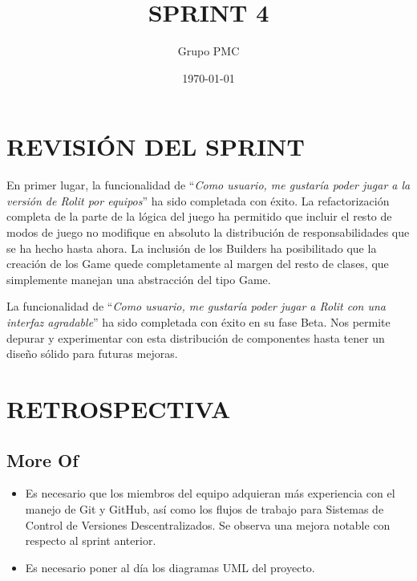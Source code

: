 \documentclass{article}
\title{SPRINT 4}
\date{\today}
\author{Grupo PMC}
\begin{document}
\maketitle
\section{REVISIÓN DEL SPRINT}
En primer lugar, la funcionalidad de ``\textit{Como usuario, me gustaría poder jugar a la versión de Rolit por equipos}'' ha sido completada con éxito. La refactorización completa de la parte de la lógica del juego ha permitido que incluir el resto de modos de juego no modifique en absoluto la distribución de responsabilidades que se ha hecho hasta ahora. La inclusión de los Builders ha posibilitado que la creación de los Game quede completamente al margen del resto de clases, que simplemente manejan una abstracción del tipo Game.

La funcionalidad de ``\textit{Como usuario, me gustaría poder jugar a Rolit con una interfaz agradable}'' ha sido completada con éxito en su fase Beta. Nos permite depurar y experimentar con esta distribución de componentes hasta tener un diseño sólido para futuras mejoras.

\section{RETROSPECTIVA}
\subsection{More Of}
\begin{itemize}
\item Es necesario que los miembros del equipo adquieran más experiencia con el manejo de Git y GitHub, así como los flujos de trabajo para Sistemas de Control de Versiones Descentralizados. Se observa una mejora notable con respecto al sprint anterior.

\item Es necesario poner al día los diagramas UML del proyecto.

\end{itemize}
\end{document}
